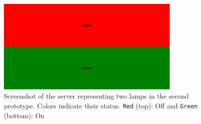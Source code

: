 \begin{figure}[!htb]
    \centering
    \includegraphics[width=0.8\textwidth]{images/Prototype2_Server.png}
    \caption{Screenshot of the server representing two lamps in the second prototype. Colors indicate their status. \texttt{Red} (top): Off and \texttt{Green} (bottom): On}
    \label{fig:prototype2-server-screenshot}
\end{figure}

